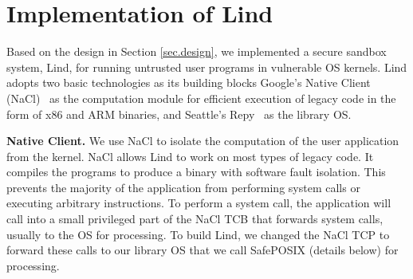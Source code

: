 \section{Implementation of Lind}
\label{sec.implementation}

Based on the design in Section \ref{sec.design},
we implemented a secure sandbox system, Lind,
for running untrusted user programs in vulnerable OS kernels.
Lind adopts two basic technologies as its building blocks\textendash
%
Google's Native Client (NaCl)~\cite{NaCl-09} as the computation
module for efficient execution of legacy code in the
form of x86 and ARM binaries, and
Seattle's Repy~\cite{Repy-10} as the library OS.


\textbf{Native Client.}
We use NaCl to isolate the computation of the user application
from the kernel. NaCl allows Lind to work on most types of legacy code.
It compiles the programs to produce a binary with software fault isolation.
This prevents the majority of the application from performing system calls
or executing arbitrary instructions.
%
To perform a system call, the application will call into a small privileged
part of the NaCl TCB that forwards system calls, usually to the OS for
processing. To build Lind, we changed the NaCl TCP to
forward these calls to our library OS that we call SafePOSIX (details below)
for processing.

